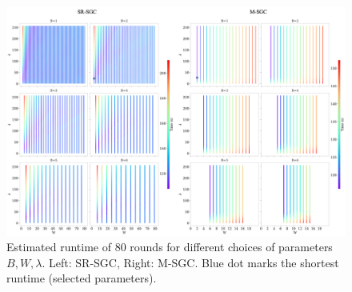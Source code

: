 
\begin{figure}[h]
    \centering
    \includegraphics[width=1\textwidth]{figs/ch2/sensitivity.png}
    \caption{ Estimated runtime of 80 rounds for different choices of parameters $B, W, \lambda$. Left: SR-SGC, Right: M-SGC. Blue dot marks the shortest runtime (selected parameters).}
    \label{ch2:fig:allparams} 
\end{figure}


